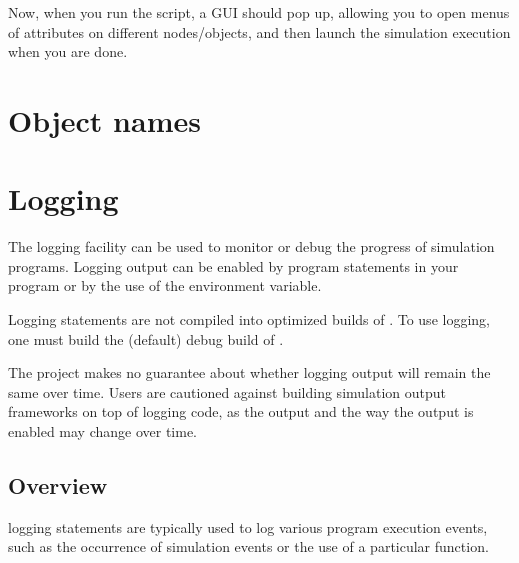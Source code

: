 \documentclass[letterpaper,10pt,english]{sphinxmanual}
\renewcommand{\sphinxcode}[1]{\texttt{\small{#1}}}
\begin{document}
\begin{sphinxVerbatim}[commandchars=\\\{\}]
 
 
 
\end{sphinxVerbatim}

Now, when you run the script, a GUI should pop up, allowing you to open menus of
attributes on different nodes/objects, and then launch the simulation execution
when you are done.


\chapter{Object names}
\label{\detokenize{object-names:object-names}}\label{\detokenize{object-names:id1}}\label{\detokenize{object-names::doc}}


\chapter{Logging}
\label{\detokenize{logging:logging}}\label{\detokenize{logging::doc}}
The  logging facility can be used to monitor or debug the progress
of simulation programs.  Logging output can be enabled by program statements
in your \sphinxcode{} program or by the use of the \sphinxcode{} environment variable.

Logging statements are not compiled into optimized builds of .  To use
logging, one must build the (default) debug build of .

The project makes no guarantee about whether logging output will remain
the same over time.  Users are cautioned against building simulation output
frameworks on top of logging code, as the output and the way the output
is enabled may change over time.


\section{Overview}
\label{\detokenize{logging:overview}}
 logging statements are typically used to log various program
execution events, such as the occurrence of simulation events or the
use of a particular function.
\end{document}
